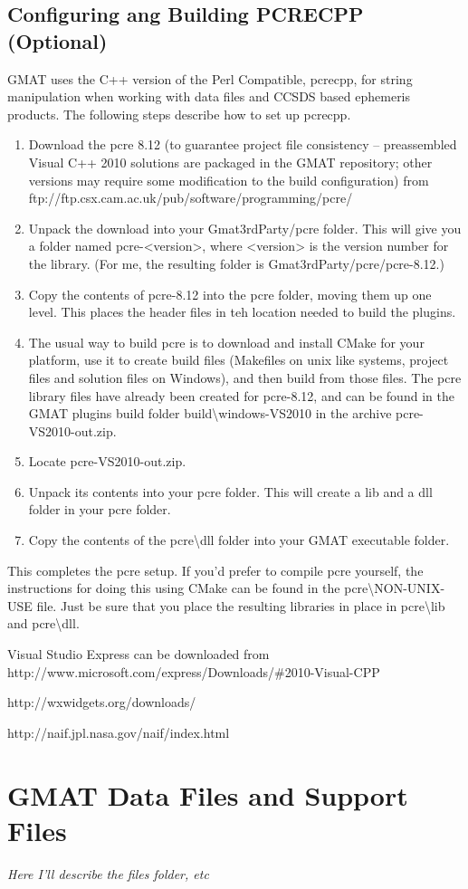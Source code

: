\documentclass[letterpaper,10pt]{article}%
\begin{document}
\subsection{Configuring ang Building PCRECPP (Optional)}

GMAT uses the C++ version of the Perl Compatible, pcrecpp, for string manipulation when working with data files and CCSDS based ephemeris products.  The following steps describe how to set up pcrecpp.

\begin{enumerate}
\item Download the pcre 8.12 (to guarantee project file consistency -- preassembled Visual C++ 2010 solutions are packaged in the GMAT repository; other versions may require some modification to the build configuration) from ftp://ftp.csx.cam.ac.uk/pub/software/programming/pcre/
\item Unpack the download into your Gmat3rdParty/pcre folder.  This will give you a folder named pcre-<version>, where <version> is the version number for the library.  (For me, the resulting folder is Gmat3rdParty/pcre/pcre-8.12.)
\item Copy the contents of pcre-8.12 into the pcre folder, moving them up one level.  This places the header files in teh location needed to build the plugins.
\item The usual way to build pcre is to download and install CMake for your platform, use it to create build files (Makefiles on unix like systems, project files and solution files on Windows), and then build from those files. The pcre library files have already been created for pcre-8.12, and can be found in the GMAT plugins build folder build\textbackslash windows-VS2010 in the archive pcre-VS2010-out.zip.
\item Locate pcre-VS2010-out.zip.
\item Unpack its contents into your pcre folder.  This will create a lib and a dll folder in your pcre folder.
\item Copy the contents of the pcre\textbackslash dll folder into your GMAT executable folder.
\end{enumerate}

This completes the pcre setup.  If you'd prefer to compile pcre yourself, the instructions for doing this using CMake can be found in the pcre\textbackslash NON-UNIX-USE file.  Just be sure that you place the resulting libraries in place in pcre\textbackslash lib and pcre\textbackslash dll.

\begin{thebibliography}{9}                                                                                               
 Visual Studio Express can be downloaded from http://www.microsoft.com/express/Downloads/\#2010-Visual-CPP

 http://wxwidgets.org/downloads/

 http://naif.jpl.nasa.gov/naif/index.html

\end{thebibliography}


\appendix

\section{GMAT Data Files and Support Files }

\textit{Here I'll describe the files folder, etc}
\end{document}
